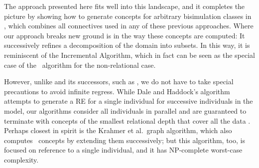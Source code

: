 The approach presented here fits well into this landscape, and it
completes the picture by showing how to generate concepts for
arbitrary bisimulation classes in \alc, which combines all connectives
used in any of these previous approaches.  Where our approach breaks
new ground is in the way these concepts are computed: It successively
refines a decomposition of the domain into subsets.  In this way, it
is reminiscent of the Incremental Algorithm, which in fact can be seen
as the special case of the \el\ algorithm for the non-relational case.

However, unlike
 and its successors,
such as , we do not
have to take special precautions to avoid infinite regress. While Dale
and Haddock's algorithm attempts to generate a RE for a single
individual for successive individuals in the model, our algorithms
consider all individuals in parallel and are guaranteed to terminate
with concepts of the smallest relational depth that cover all the data
. Perhaps closest in spirit is the
Krahmer et al.\ graph algorithm, which also computes \el\ concepts by
extending them successively; but this algorithm, too, is focused on
reference to a single individual, and it has NP-complete worst-case
complexity.







